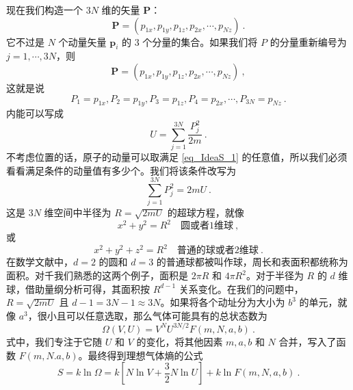 现在我们构造一个 $3N $ 维的矢量 $\mathbf P$：
\begin{equation}
\mathbf{P}=\left( p_{1x},p_{1y},p_{1z},p_{2x},\cdots ,p_{Nz} \right) ~.
\end{equation}
它不过是 $N$ 个动量矢量 $\boldsymbol p_i$ 的 $3 $ 个分量的集合。如果我们将 $P $ 的分量重新编号为 $j=1, \cdots , 3N$，则
\begin{equation}
\mathbf{P}=\left( p_{1x},p_{1y},p_{1z},p_{2x},\cdots ,p_{Nz} \right) ~,
\end{equation}
这就是说
\begin{equation}
P_1=p_{1x},P_2=p_{1y},P_3=p_{1z},P_4=p_{2x},\cdots ,P_{3N}=p_{Nz}~.
\end{equation}
内能可以写成
\begin{equation} \label{eq_IdeaS_1}
U=\sum_{j=1}^{3N}{\frac{P_{j}^{2}}{2m}}~.
\end{equation}
不考虑位置的话，原子的动量可以取满足 \autoref{eq_IdeaS_1} 的任意值，所以我们必须看看满足条件的动量值有多少个。我们将该条件改写为
\begin{equation}
\sum_{j=1}^{3N}{P_{j}^{2}}=2mU~.
\end{equation}
这是 $3N$ 维空间中半径为 $R=\sqrt{2mU}$ 的超球方程，就像
\begin{equation}
x^2+y^2=R^2 \quad \text{圆或者1维球}~,
\end{equation}
或
\begin{equation}
x^2+y^2+z^2=R^2 \quad \text{普通的球或者2维球}~.
\end{equation}
在数学文献中，$ d=2 $ 的圆和 $d=3 $ 的普通球都被叫作球，周长和表面积都统称为面积。对千我们熟悉的这两个例子，面积是 $2\pi R$ 和 $4\pi R^2$。对于半径为 $R $ 的 $d $ 维球，借助量纲分析可得，其面积按 $R^{d-1}$ 关系变化。在我们的问题中，$R=\sqrt{2mU}$ 且 $d-1 = 3N-1 \approx 3N$。如果将各个动址分为大小为 $b^3$ 的单元，就像 $a^3$，很小且可以任意选取，那么气体可能具有的总状态数为
\begin{equation}
\Omega \left( V,U \right) =V^NU^{3N/2}F\left( m,N,a,b \right) ~.
\end{equation}
式中，我们专注于它随 $U $ 和 $V $ 的变化，将其他因素 $m, a, b $ 和 $N $ 合并，写入了函数 $F(m, N. a, b) $。最终得到理想气体熵的公式
\begin{equation}
S=k\ln \Omega =k\left[ N\ln V+\frac{3}{2}N\ln U \right] +k\ln F\left( m,N,a,b \right) ~.
\end{equation}
